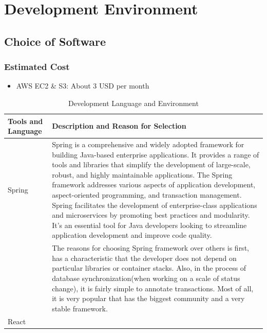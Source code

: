 \documentclass[conference]{IEEEtran}
\begin{document}
\section{Development Environment}
    \subsection{Choice of Software}
        \subsubsection{Estimated Cost}
            \begin{itemize}
                \item AWS EC2 \& S3: About 3 USD per month
            \end{itemize}
    \begin{table}[htbp]
        \caption{Development Language and Environment}
        \centering
        \begin{tabular}{| p{1.2cm}|p{6.8cm} |} 
             \hline
             Tools and Language & Description and Reason for Selection \\ [0.5ex]
             \hline
             Spring & Spring is a comprehensive and widely adopted framework for building Java-based enterprise applications. It provides a range of tools and libraries that simplify the development of large-scale, robust, and highly maintainable applications. The Spring framework addresses various aspects of application development, aspect-oriented programming, and transaction management. Spring facilitates the development of enterprise-class applications and microservices by promoting best practices and modularity. It's an essential tool for Java developers looking to streamline application development and improve code quality.\\
            &
            The reasons for choosing Spring framework over others is first, has a characteristic that the developer does not depend on particular libraries or container stacks. Also, in the process of database synchronization(when working on a scale of status change), it is fairly simple to annotate transactions. Most of all, it is very popular that has the biggest community and a very stable framework. \\
             \hline
             React
             

\end{tabular}
\end{table}
\end{document}
